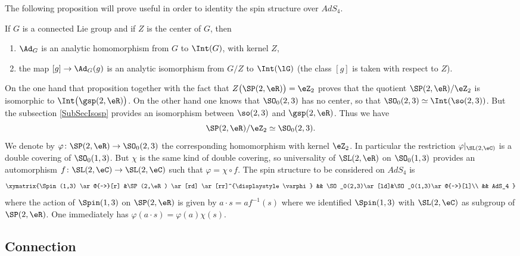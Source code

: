 The following proposition will prove useful in order to identity the spin structure over $AdS_4$.

\begin{proposition}
If $G$ is a connected Lie group and if $Z$ is the center of $G$, then
\begin{enumerate}
\item $\Ad_G$ is an analytic homomorphism from $G$ to $\Int(G)$, with kernel $Z$,
\item the map $[g]\to\Ad_G(g)$ is an analytic isomorphism from $G/Z$ to $\Int(\lG)$ (the class $[g]$ is taken with respect to $Z$).
\end{enumerate}
\end{proposition}
On the one hand that proposition together with the fact that $Z\big( \SP(2,\eR) \big)=\eZ_2$ proves that the quotient $\SP(2,\eR)/\eZ_2$ is isomorphic to $\Int\big(\gsp(2,\eR)\big)$. On the other hand one knows that $\SO_0(2,3)$ has no center, so that $\SO_0(2,3)\simeq\Int(\so(2,3))$. But the subsection \ref{SubSecIsosp} provides an isomorphism between $\so(2,3)$ and $\gsp(2,\eR)$. Thus we have
\begin{equation}
\SP(2,\eR)/\eZ_2\simeq \SO_0(2,3).
\end{equation}
We denote by $\varphi\colon \SP(2,\eR)\to \SO_0(2,3)$ the corresponding homomorphism with kernel $\eZ_2$. In particular the restriction $\varphi|_{\SL(2,\eC)}$ is a double covering of $\SO_0(1,3)$. But $\chi$ is the same kind of double covering, so universality of $\SL(2,\eR)$ on $\SO_0(1,3)$ provides an automorphism $f\colon \SL(2,\eC)\to \SL(2,\eC)$ such that $\varphi=\chi\circ f$. The spin structure to be considered on $AdS_4$ is
\[ 
\xymatrix{%
   \Spin(1,3) \ar@{~>}[r]       &\SP(2,\eR)  \ar[rd] \ar[rr]^{\displaystyle\varphi} &&  \SO_0(2,3)\ar[ld]&\SO_0(1,3)\ar@{~>}[l]\\
   &&   AdS_4 
}
\]
where the action of $\Spin(1,3)$ on $\SP(2,\eR)$ is given by $a\cdot s=af^{-1}(s)$ where we identified $\Spin(1,3)$ with $\SL(2,\eC)$ as subgroup of $\SP(2,\eR)$. One immediately has $\varphi(a\cdot s)=\varphi(a)\chi(s)$.


\subsection{Connection}

